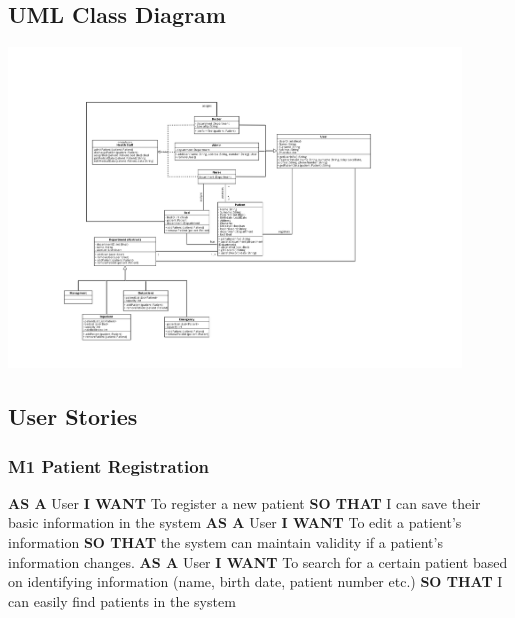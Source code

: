\subsection{UML Class Diagram}
%
\includegraphics[width=0.9\textwidth]{Figures/ClassDiagram.png}
%
\subsection{User Stories}
%
\subsubsection*{M1 Patient Registration}
%
\textbf{AS A} User\hfill \break
\textbf{I WANT} To register a new patient\hfill \break
\textbf{SO THAT} I can save their basic information in the system\hfill \medbreak
%
\textbf{AS A} User\hfill \break
\textbf{I WANT} To edit a patient's information\hfill \break
\textbf{SO THAT} the system can maintain validity if a patient's information changes.\hfill \medbreak
%
\textbf{AS A} User\hfill \break
\textbf{I WANT} To search for a certain patient based on identifying information (name, birth date, patient number etc.)\hfill \break
\textbf{SO THAT} I can easily find patients in the system\hfill \medbreak
%
